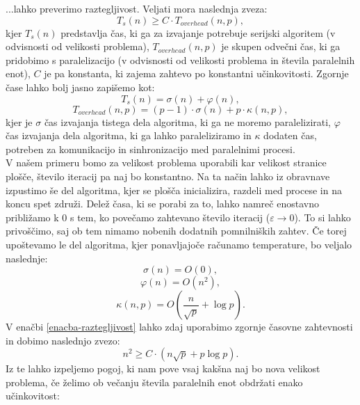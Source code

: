 \documentclass[a4paper,titlepage,11pt]{article}
\begin{document}
...lahko preverimo raztegljivost. Veljati mora naslednja zveza:
\begin{equation} \label{enacba-raztegljivost}
T_s(n) \geq C \cdot T_{overhead}(n,p),
\end{equation}
kjer \(T_s(n)\) predstavlja čas, ki ga za izvajanje potrebuje serijski algoritem (v odvisnosti od velikosti problema), \(T_{overhead}(n,p)\) je skupen odvečni čas, ki ga pridobimo s paralelizacijo (v odvisnosti od velikosti problema in števila paralelnih enot), \(C\) je pa konstanta, ki zajema zahtevo po konstantni učinkovitosti. Zgornje čase lahko bolj jasno zapišemo kot:
\begin{equation}
T_s(n) = \sigma(n) + \varphi(n),
\end{equation}
\begin{equation}
T_{overhead}(n,p) = (p-1) \cdot \sigma(n) + p \cdot \kappa(n,p),
\end{equation}
kjer je \(\sigma\) čas izvajanja tistega dela algoritma, ki ga ne moremo paralelizirati, \(\varphi\) čas izvajanja dela algoritma, ki ga lahko paraleliziramo in \(\kappa\) dodaten čas, potreben za komunikacijo in sinhronizacijo med paralelnimi procesi. \\
V našem primeru bomo za velikost problema uporabili kar velikost stranice plošče, število iteracij pa naj bo konstantno. Na ta način lahko iz obravnave izpustimo še del algoritma, kjer se plošča inicializira, razdeli med procese in na koncu spet združi. Delež časa, ki se porabi za to, lahko namreč enostavno približamo k 0 s tem, ko povečamo zahtevano število iteracij (\(\varepsilon \to 0\)). To si lahko privoščimo, saj ob tem nimamo nobenih dodatnih pomnilniških zahtev. Če torej upoštevamo le del algoritma, kjer ponavljajoče računamo temperature, bo veljalo naslednje:
\begin{equation}
\sigma(n) = O(0),
\end{equation}
\begin{equation}
\varphi(n) = O(n^2),
\end{equation}
\begin{equation}
\kappa(n,p) = O(\frac{n}{\sqrt{p}} + \log{p}).
\end{equation}
V enačbi \ref{enacba-raztegljivost} lahko zdaj uporabimo zgornje časovne zahtevnosti in dobimo naslednjo zvezo:
\begin{equation}
n^2 \geq C \cdot (n \sqrt{p} + p \log{p}).
\end{equation}
Iz te lahko izpeljemo pogoj, ki nam pove vsaj kakšna naj bo nova velikost problema, če želimo ob večanju števila paralelnih enot obdržati enako učinkovitost:
\end{document}
